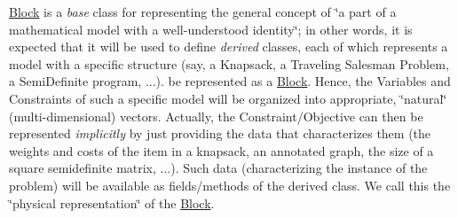 \mbox{\hyperlink{class_s_m_spp__di__unipi__it_1_1_block}{Block}} is a {\itshape base} class for representing the general concept of \char`\"{}a part of
a mathematical model with a well-\/understood identity\char`\"{}; in other words, it is expected that it will be used to define {\itshape derived} classes, each of which represents a model with a specific structure (say, a Knapsack, a Traveling Salesman Problem, a Semi\+Definite program, ...). be represented as a \mbox{\hyperlink{class_s_m_spp__di__unipi__it_1_1_block}{Block}}. Hence, the Variables and Constraints of such a specific model will be organized into appropriate, \char`\"{}natural\char`\"{} (multi-\/dimensional) vectors. Actually, the Constraint/\+Objective can then be represented {\itshape implicitly} by just providing the data that characterizes them (the weights and costs of the item in a knapsack, an annotated graph, the size of a square semidefinite matrix, ...). Such data (characterizing the instance of the problem) will be available as fields/methods of the derived class. We call this the \char`\"{}physical representation\char`\"{} of the \mbox{\hyperlink{class_s_m_spp__di__unipi__it_1_1_block}{Block}}.

